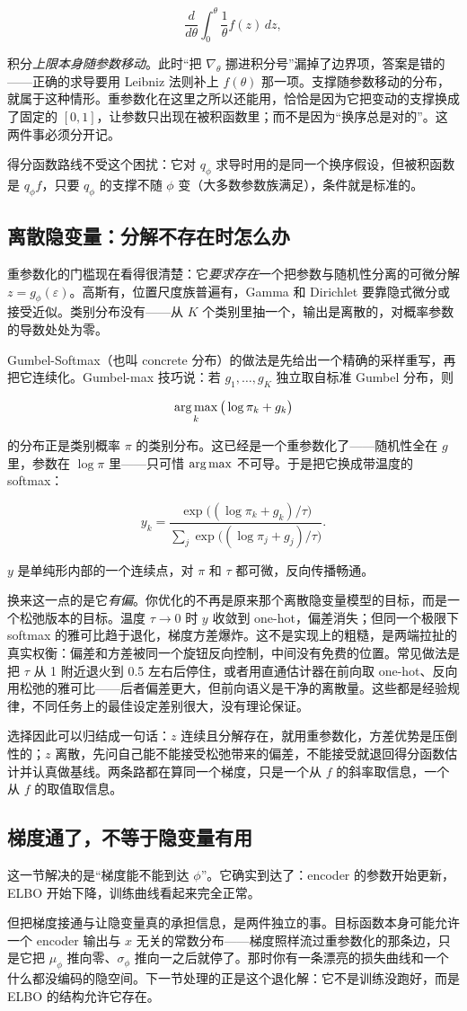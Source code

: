\[
\frac{d}{d\theta}\int_0^\theta \frac{1}{\theta}f(z)\,dz ,
\]

积分\emph{上限本身随参数移动}。此时``把 \(\nabla_\theta\) 挪进积分号''漏掉了边界项，答案是错的——正确的求导要用 Leibniz 法则补上 \(f(\theta)\) 那一项。支撑随参数移动的分布，就属于这种情形。重参数化在这里之所以还能用，恰恰是因为它把变动的支撑换成了固定的 \([0,1]\)，让参数只出现在被积函数里；而不是因为``换序总是对的''。这两件事必须分开记。

得分函数路线不受这个困扰：它对 \(q_\phi\) 求导时用的是同一个换序假设，但被积函数是 \(q_\phi f\)，只要 \(q_\phi\) 的支撑不随 \(\phi\) 变（大多数参数族满足），条件就是标准的。

\subsection{离散隐变量：分解不存在时怎么办}

重参数化的门槛现在看得很清楚：它\emph{要求存在}一个把参数与随机性分离的可微分解 \(z=g_\phi(\varepsilon)\)。高斯有，位置尺度族普遍有，Gamma 和 Dirichlet 要靠隐式微分或接受近似。类别分布没有——从 \(K\) 个类别里抽一个，输出是离散的，对概率参数的导数处处为零。

Gumbel-Softmax（也叫 concrete 分布）的做法是先给出一个精确的采样重写，再把它连续化。Gumbel-max 技巧说：若 \(g_1,\dots,g_K\) 独立取自标准 Gumbel 分布，则

\[
\operatorname*{arg\,max}_k \big(\log \pi_k + g_k\big)
\]

的分布正是类别概率 \(\pi\) 的类别分布。这已经是一个重参数化了——随机性全在 \(g\) 里，参数在 \(\log\pi\) 里——只可惜 \(\operatorname*{arg\,max}\) 不可导。于是把它换成带温度的 softmax：

\[
y_k = \frac{\exp\big((\log\pi_k+g_k)/\tau\big)}{\sum_{j}\exp\big((\log\pi_j+g_j)/\tau\big)}.
\]

\(y\) 是单纯形内部的一个连续点，对 \(\pi\) 和 \(\tau\) 都可微，反向传播畅通。

换来这一点的是它\emph{有偏}。你优化的不再是原来那个离散隐变量模型的目标，而是一个松弛版本的目标。温度 \(\tau\to 0\) 时 \(y\) 收敛到 one-hot，偏差消失；但同一个极限下 softmax 的雅可比趋于退化，梯度方差爆炸。这不是实现上的粗糙，是两端拉扯的真实权衡：偏差和方差被同一个旋钮反向控制，中间没有免费的位置。常见做法是把 \(\tau\) 从 1 附近退火到 0.5 左右后停住，或者用直通估计器在前向取 one-hot、反向用松弛的雅可比——后者偏差更大，但前向语义是干净的离散量。这些都是经验规律，不同任务上的最佳设定差别很大，没有理论保证。

选择因此可以归结成一句话：\(z\) 连续且分解存在，就用重参数化，方差优势是压倒性的；\(z\) 离散，先问自己能不能接受松弛带来的偏差，不能接受就退回得分函数估计并认真做基线。两条路都在算同一个梯度，只是一个从 \(f\) 的斜率取信息，一个从 \(f\) 的取值取信息。

\subsection{梯度通了，不等于隐变量有用}

这一节解决的是``梯度能不能到达 \(\phi\)''。它确实到达了：encoder 的参数开始更新，ELBO 开始下降，训练曲线看起来完全正常。

但把梯度接通与让隐变量真的承担信息，是两件独立的事。目标函数本身可能允许一个 encoder 输出与 \(x\) 无关的常数分布——梯度照样流过重参数化的那条边，只是它把 \(\mu_\phi\) 推向零、\(\sigma_\phi\) 推向一之后就停了。那时你有一条漂亮的损失曲线和一个什么都没编码的隐空间。下一节处理的正是这个退化解：它不是训练没跑好，而是 ELBO 的结构允许它存在。
